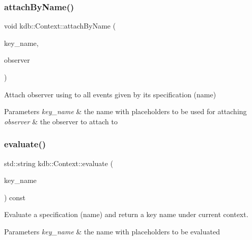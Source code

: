 \subsubsection{\texorpdfstring{attachByName()}{attachByName()}}
{\footnotesize\ttfamily void kdb\+::\+Context\+::attach\+By\+Name (\begin{DoxyParamCaption}\item[{std\+::string const \&}]{key\+\_\+name,  }\item[{\mbox{\hyperlink{classkdb_1_1ValueObserver}{Value\+Observer}} \&}]{observer }\end{DoxyParamCaption})\hspace{0.3cm}{\ttfamily [inline]}}



Attach observer using to all events given by its specification (name) 


\begin{DoxyParams}{Parameters}
{\em key\+\_\+name} & the name with placeholders to be used for attaching \\
\hline
{\em observer} & the observer to attach to \\
\hline
\end{DoxyParams}
\mbox{\label{classkdb_1_1Context_a7cf9cda848595583ea35c8041d6466ee}} 
\subsubsection{\texorpdfstring{evaluate()}{evaluate()}\hspace{0.1cm}{\footnotesize\ttfamily [1/2]}}
{\footnotesize\ttfamily std\+::string kdb\+::\+Context\+::evaluate (\begin{DoxyParamCaption}\item[{std\+::string const \&}]{key\+\_\+name }\end{DoxyParamCaption}) const\hspace{0.3cm}{\ttfamily [inline]}}



Evaluate a specification (name) and return a key name under current context. 


\begin{DoxyParams}{Parameters}
{\em key\+\_\+name} & the name with placeholders to be evaluated \\
\hline
\end{DoxyParams}
\mbox{\label{classkdb_1_1Context_a50ecf7ad3b5685f11a0bdaa65abd8f62}} 
